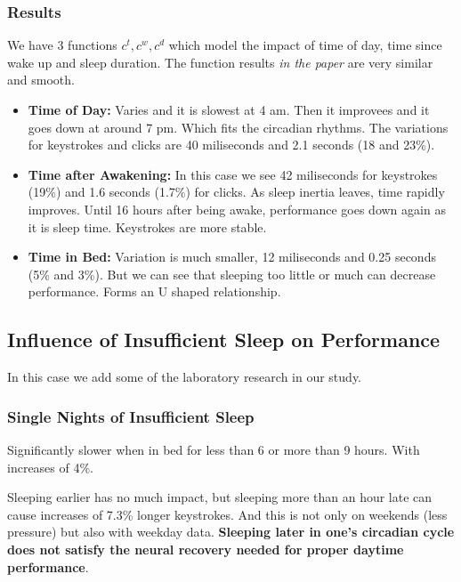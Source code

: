\documentclass{IEEEtran}
\begin{document}
      \subsubsection{Results}
        We have 3 functions $c^t,c^w,c^d$ which model the impact of time of day, time since wake up and sleep duration. The function results \textit{in the paper} are very similar and smooth.
        \begin{itemize}
          \item \textbf{Time of Day:} Varies and it is slowest at 4 am. Then it improvees and it goes down at around 7 pm. Which fits the circadian rhythms. The variations for keystrokes and clicks are 40 miliseconds and 2.1 seconds (18 and 23\%).
          \item \textbf{Time after Awakening:} In this case we see 42 miliseconds for keystrokes (19\%) and 1.6 seconds (1.7\%) for clicks. As sleep inertia leaves, time rapidly improves. Until 16 hours after being awake, performance goes down again as it is sleep time. Keystrokes are more stable.
          \item \textbf{Time in Bed:} Variation is much smaller, 12 miliseconds and 0.25 seconds (5\% and 3\%). But we can see that sleeping too little or much can decrease performance. Forms an U shaped relationship.
        \end{itemize}
    \subsection{Influence of Insufficient Sleep on Performance}
      In this case we add some of the laboratory research in our study.
      \subsubsection{Single Nights of Insufficient Sleep}
        Significantly slower when in bed for less than 6 or more than 9 hours. With increases of 4\%. \par 
        Sleeping earlier has no much impact, but sleeping more than an hour late can cause increases of 7.3\% longer keystrokes. And this is not only on weekends (less pressure) but also with weekday data. \textbf{Sleeping later in one's circadian cycle does not satisfy the neural recovery needed for proper daytime performance}.
\end{document}
